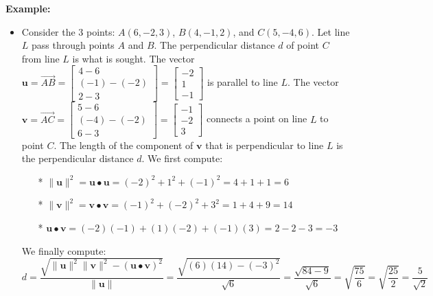\documentclass{article}
\begin{document}
\textbf{Example:}
\begin{itemize}
\item Consider the 3 points: \(A(6, -2, 3)\), \(B(4, -1, 2)\), and \(C(5, -4, 6)\). Let line \(L\) pass through points \(A\) and \(B\). The perpendicular distance \(d\) of point \(C\) from line \(L\) is what is sought. The vector \(\mathbf{u} = \overrightarrow{AB} = \begin{bmatrix} 4 - 6 \\ (-1) - (-2) \\ 2 - 3 \end{bmatrix} = \begin{bmatrix} -2 \\ 1 \\ -1 \end{bmatrix}\) is parallel to line \(L\). The vector \(\mathbf{v} = \overrightarrow{AC} = \begin{bmatrix} 5 - 6 \\ (-4) - (-2) \\ 6 - 3 \end{bmatrix} = \begin{bmatrix} -1 \\ -2 \\ 3 \end{bmatrix}\) connects a point on line \(L\) to point \(C\). The length of the component of \(\mathbf{v}\) that is perpendicular to line \(L\) is the perpendicular distance \(d\). We first compute:
\begin{itemize}
\item[*] \(\|\mathbf{u}\|^2 = \mathbf{u} \bullet \mathbf{u} = (-2)^2 + 1^2 + (-1)^2 = 4 + 1 + 1 = 6\)
\item[*] \(\|\mathbf{v}\|^2 = \mathbf{v} \bullet \mathbf{v} = (-1)^2 + (-2)^2 + 3^2 = 1 + 4 + 9 = 14\)
\item[*] \(\mathbf{u} \bullet \mathbf{v} = (-2)(-1) + (1)(-2) + (-1)(3) = 2 - 2 - 3 = -3\)
\end{itemize} 
We finally compute:
\[d = \frac{\sqrt{\|\mathbf{u}\|^2 \|\mathbf{v}\|^2 - (\mathbf{u} \bullet \mathbf{v})^2}}{\|\mathbf{u}\|}
= \frac{\sqrt{(6)(14) - (-3)^2}}{\sqrt{6}}
= \frac{\sqrt{84 - 9}}{\sqrt{6}} 
= \sqrt{\frac{75}{6}}
= \sqrt{\frac{25}{2}}
= \frac{5}{\sqrt{2}}\] 
\end{itemize}
\end{document}
